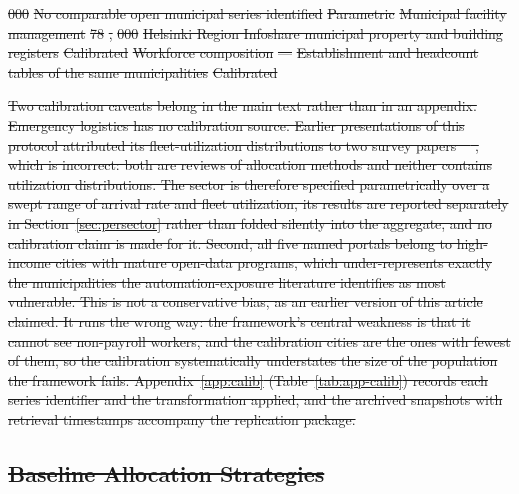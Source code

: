 \documentclass[utf8]{FrontiersinHarvard}
\providecommand{\DIFdel}[1]{{\protect\color{red}\sout{#1}}}                      %
\providecommand{\DIFdelFL}[1]{\DIFdel{#1}} %
\begin{document}
\DIFdelFL{000 }%
\DIFdelFL{No comparable open municipal series identified }%
\DIFdelFL{Parametric}%
\DIFdelFL{Municipal facility management }%
\DIFdelFL{78}%
\DIFdelFL{,}%
\DIFdelFL{000 }%
\DIFdelFL{Helsinki Region Infoshare municipal property and building registers }%
\DIFdelFL{Calibrated}%
\DIFdelFL{Workforce composition }%
\DIFdelFL{--- }%
\DIFdelFL{Establishment and headcount tables of the same municipalities }%
\DIFdelFL{Calibrated}%

\DIFdel{Two calibration caveats belong in the main text rather than in an appendix. Emergency logistics has no calibration source. Earlier presentations of this protocol attributed its fleet-utilization distributions to two survey papers~\mbox{%
\cite{MeseguerValenzuela2025,Hady2025}}\hskip0pt%
, which is incorrect: both are reviews of allocation methods and neither contains utilization distributions. The sector is therefore specified parametrically over a swept range of arrival rate and fleet utilization, its results are reported separately in Section~\ref{sec:persector} rather than folded silently into the aggregate, and no calibration claim is made for it. Second, all five named portals belong to high-income cities with mature open-data programs, which under-represents exactly the municipalities the automation-exposure literature identifies as most vulnerable. This is not a conservative bias, as an earlier version of this article claimed. It runs the wrong way: the framework's central weakness is that it cannot see non-payroll workers, and the calibration cities are the ones with fewest of them, so the calibration systematically understates the size of the population the framework fails. Appendix~\ref{app:calib} (Table~\ref{tab:app-calib}) records each series identifier and the transformation applied, and the archived snapshots with retrieval timestamps accompany the replication package.
	}%

\subsection{\DIFdel{Baseline Allocation Strategies}}
\addtocounter{subsection}{-1}%
\end{document}
